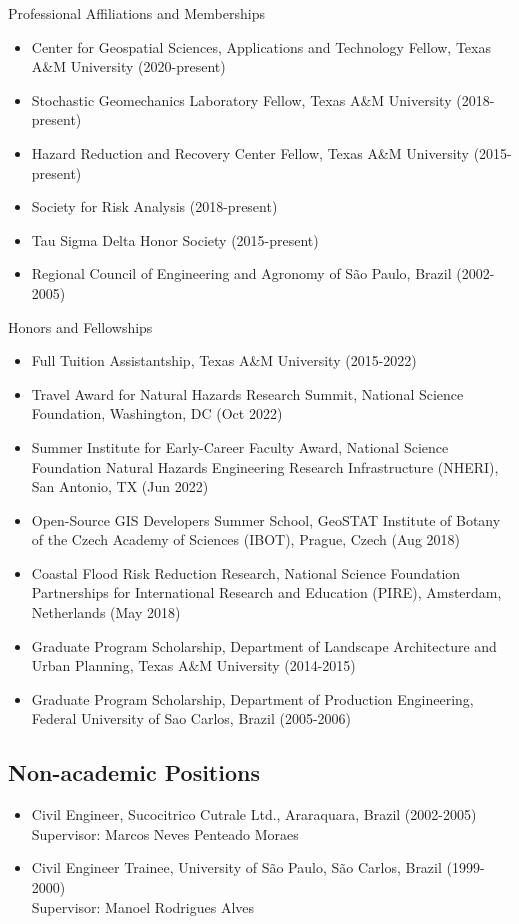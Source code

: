 \documentclass[11pt,oneside]{article}
\begin{document}
\vspace{3pt}

{Professional Affiliations and Memberships}
\begin{itemize}[leftmargin=20pt]
\item Center for Geospatial Sciences, Applications and Technology Fellow, Texas A\&M University (2020-present)
\item Stochastic Geomechanics Laboratory Fellow, Texas A\&M University (2018-present)
\item Hazard Reduction and Recovery Center Fellow, Texas A\&M University (2015-present)
\item Society for Risk Analysis (2018-present)
\item Tau Sigma Delta Honor Society (2015-present)
\item Regional Council of Engineering and Agronomy of São Paulo, Brazil (2002-2005)
\end{itemize}

\vspace{3pt}

{Honors and Fellowships}
\begin{itemize}[leftmargin=20pt]
\item {Full Tuition Assistantship}, Texas A\&M University (2015-2022)
\item {Travel Award for Natural Hazards Research Summit}, National Science Foundation, Washington, DC (Oct 2022)
\item {Summer Institute for Early-Career Faculty Award}, National Science Foundation Natural Hazards Engineering Research Infrastructure (NHERI), San Antonio, TX (Jun 2022)
\item {Open-Source GIS Developers Summer School}, GeoSTAT Institute of Botany of the Czech Academy of Sciences (IBOT), Prague, Czech (Aug 2018)
\item {Coastal Flood Risk Reduction Research}, National Science Foundation Partnerships for International Research and Education (PIRE), Amsterdam, Netherlands (May 2018)
\item {Graduate Program Scholarship}, Department of Landscape Architecture and Urban Planning, Texas A\&M University (2014-2015)
\item {Graduate Program Scholarship}, Department of Production Engineering, Federal University of Sao Carlos, Brazil (2005-2006)
\end{itemize}

\subsection*{Non-academic Positions}
\begin{itemize}[leftmargin=20pt]
\item Civil Engineer, Sucocitrico Cutrale Ltd., Araraquara, Brazil (2002-2005)\\
      Supervisor: Marcos Neves Penteado Moraes
\item Civil Engineer Trainee, University of São Paulo, São Carlos, Brazil (1999-2000)\\
      Supervisor: Manoel Rodrigues Alves
\end{itemize}
\end{document}
